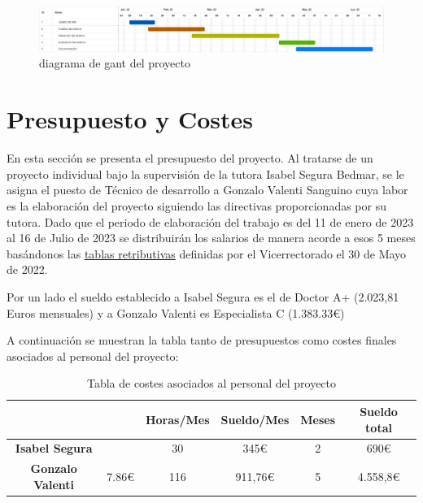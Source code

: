 \begin{figure}[H]
    \centering
    \includegraphics[width=16cm]{imagenes/Gestion/gant.png}
    \caption{\centering diagrama de gant del proyecto}
\end{figure}


\section{Presupuesto y Costes}

En esta sección se presenta el presupuesto del proyecto. Al tratarse de un proyecto individual bajo la supervisión de la tutora Isabel Segura Bedmar, se le asigna el puesto de Técnico de desarrollo a Gonzalo Valenti Sanguino cuya labor es la elaboración del proyecto siguiendo las directivas proporcionadas por su tutora. Dado que el periodo de elaboración del trabajo es del 11 de enero de 2023 al 16 de Julio de 2023 se distribuirán los salarios de manera acorde a esos 5 meses basándonos las \href{https://www.uc3m.es/pdi/media/pdi/doc/archivo/doc_tablas-retributivas-mayo22/tablas-retributivas_contratos-proyectos_30052022.pdf}{tablas retributivas} definidas por el Vicerrectorado el 30 de Mayo de 2022.

Por un lado el sueldo establecido a Isabel Segura es el de Doctor A+ (2.023,81 Euros mensuales) y a Gonzalo Valenti es Especialista C (1.383.33€)


A continuación se muestran la tabla tanto de presupuestos como costes finales asociados al personal del proyecto:

\begin{table}[H]
\begin{tabular}{|c|c|c|c|c|c|}
\hline
\rowcolor[HTML]{9B9B9B} 
\cellcolor[HTML]{9B9B9B}{\color[HTML]{000000} \textbf{Personal}} 
& \cellcolor[HTML]{9B9B9B}{\color[HTML]{000000} \textbf{Sueldo/Hora}} 
& \textbf{Horas/Mes}
& \textbf{Sueldo/Mes}         
& \textbf{Meses} 
& \textbf{Sueldo total}     
\\ \hline
\rowcolor[HTML]{C0C0C0} 
{\color[HTML]{000000} \textbf{Isabel Segura}}                  
& \cellcolor[HTML]{C0C0C0}{\color[HTML]{000000} 11.5€}             
& 30                
& \cellcolor[HTML]{C0C0C0}345€ & 2            
& \cellcolor[HTML]{C0C0C0}690€ \\ \hline
\rowcolor[HTML]{C0C0C0} 
{\color[HTML]{000000} \textbf{Gonzalo Valenti}}              
& {\color[HTML]{000000} 7.86€}                                  
& 116                
& 911,76€                     
& 5             
& 4.558,8€                   
\\ \hline
\end{tabular}
\caption{Tabla de costes asociados al personal del proyecto}
\end{table}

